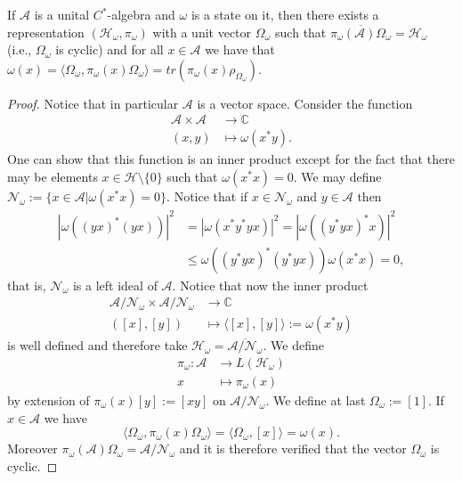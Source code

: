\begin{theorem}
If $\mathcal{A}$ is a unital $C^*$-algebra and $\omega$ is a state on it, then there exists a representation $(\mathcal{H}_\omega,\pi_\omega)$ with a unit vector $\Omega_\omega$ such that $\overline{\pi_\omega(\mathcal{A})\Omega_\omega}=\mathcal{H}_\omega$ (i.e., $\Omega_\omega$ is cyclic) and for all $x\in\mathcal{A}$ we have that $\omega(x)=\langle\Omega_\omega,\pi_\omega(x)\Omega_\omega\rangle=tr(\pi_\omega(x)\rho_{\Omega_\omega})$.  
\end{theorem}

\begin{proof}
Notice that in particular $\mathcal{A}$ is a vector space. Consider the function
\begin{align}
\mathcal{A}\times\mathcal{A}&\rightarrow\mathbb{C} \\
(x,y)&\mapsto\omega(x^*y). \nonumber
\end{align}
One can show that this function is an inner product except for the fact that there may be elements $x\in\mathcal{H}\setminus\{0\}$ such that $\omega(x^*x)=0$. We may define $\mathcal{N}_\omega := \{x\in\mathcal{A}|\omega(x^*x)=0\}$. Notice that if $x\in\mathcal{N}_\omega$ and $y\in\mathcal{A}$ then 
\begin{align}
|\omega((yx)^*(yx))|^2&=|\omega(x^*y^*yx)|^2=|\omega((y^*yx)^*x)|^2 \\
&\leq\omega((y^*yx)^*(y^*yx))\omega(x^*x)=0, \nonumber
\end{align}
that is, $\mathcal{N}_\omega$ is a left ideal of $\mathcal{A}$. Notice that now the inner product
\begin{align}
\mathcal{A}/\mathcal{N}_\omega\times\mathcal{A}/\mathcal{N}_\omega&\rightarrow\mathbb{C} \\
([x],[y])&\mapsto\langle[x],[y]\rangle:=\omega(x^*y) \nonumber
\end{align}
is well defined and therefore take $\mathcal{H}_\omega=\overline{\mathcal{A}/\mathcal{N}_\omega}$. We define 
\begin{align}
\pi_\omega:\mathcal{A}&\rightarrow L(\mathcal{H}_\omega) \\
x&\mapsto \pi_\omega(x) \nonumber
\end{align}
by extension of $\pi_\omega(x)[y]:=[xy]$ on $\mathcal{A}/\mathcal{N}_\omega$. We define at last $\Omega_\omega:=[1]$. If $x\in\mathcal{A}$ we have
\begin{equation}\label{eqn:state_representation}
\langle \Omega_\omega, \pi_\omega(x)\Omega_\omega\rangle = \langle \Omega_\omega, [x]\rangle = \omega(x). 
\end{equation}
Moreover $\pi_\omega(\mathcal{A})\Omega_\omega = \mathcal{A}/\mathcal{N}_\omega$ and it is therefore verified that the vector $\Omega_\omega$ is cyclic.  
\end{proof}

